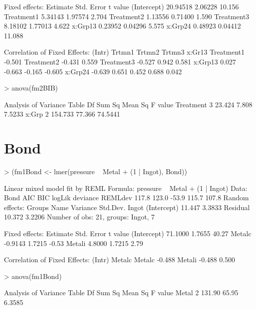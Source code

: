 \documentclass[12pt]{article}
\begin{document}
\begin{Schunk}
\begin{Soutput}
Fixed effects:
            Estimate Std. Error t value
(Intercept) 20.94518    2.06228  10.156
Treatment1   5.34143    1.97574   2.704
Treatment2   1.13556    0.71400   1.590
Treatment3   8.18102    1.77013   4.622
x:Grp13      0.23952    0.04296   5.575
x:Grp24      0.48923    0.04412  11.088

Correlation of Fixed Effects:
           (Intr) Trtmn1 Trtmn2 Trtmn3 x:Gr13
Treatment1 -0.501                            
Treatment2 -0.431  0.559                     
Treatment3 -0.527  0.942  0.581              
x:Grp13     0.027 -0.663 -0.165 -0.605       
x:Grp24    -0.639  0.651  0.452  0.688  0.042
\end{Soutput}
\begin{Sinput}
> anova(fm2BIB)
\end{Sinput}
\begin{Soutput}
Analysis of Variance Table
          Df  Sum Sq Mean Sq F value
Treatment  3  23.424   7.808  7.5233
x:Grp      2 154.733  77.366 74.5441
\end{Soutput}
\end{Schunk}


\section{Bond}
\label{sec:Bond}

\begin{Schunk}
\begin{Sinput}
> (fm1Bond <- lmer(pressure ~ Metal + (1 | Ingot), Bond))
\end{Sinput}
\begin{Soutput}
Linear mixed model fit by REML 
Formula: pressure ~ Metal + (1 | Ingot) 
   Data: Bond 
   AIC   BIC logLik deviance REMLdev
 117.8 123.0  -53.9    115.7   107.8
Random effects:
 Groups   Name        Variance Std.Dev.
 Ingot    (Intercept) 11.447   3.3833  
 Residual             10.372   3.2206  
Number of obs: 21, groups: Ingot, 7

Fixed effects:
            Estimate Std. Error t value
(Intercept)  71.1000     1.7655   40.27
Metalc       -0.9143     1.7215   -0.53
Metali        4.8000     1.7215    2.79

Correlation of Fixed Effects:
       (Intr) Metalc
Metalc -0.488       
Metali -0.488  0.500
\end{Soutput}
\begin{Sinput}
> anova(fm1Bond)
\end{Sinput}
\begin{Soutput}
Analysis of Variance Table
      Df Sum Sq Mean Sq F value
Metal  2 131.90   65.95  6.3585
\end{Soutput}
\end{Schunk}
\end{document}

